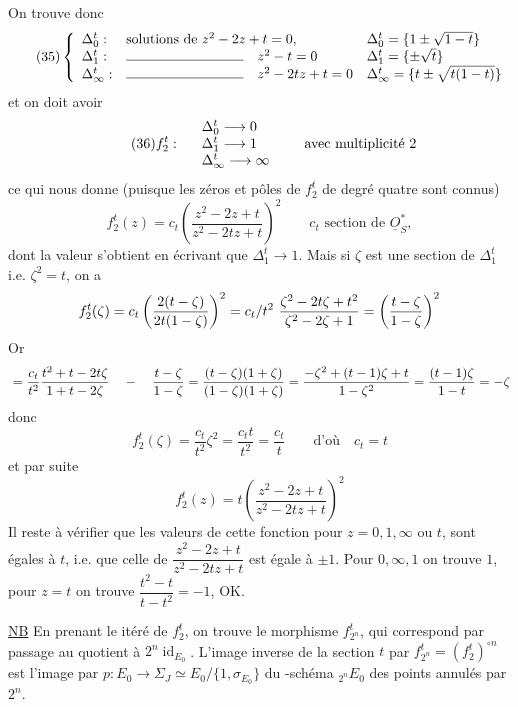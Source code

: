 On trouve donc
\[
\tag{35}\left\{\begin{array}{lll}
\Delta_0^t:&\text{solutions de }z^2-2z+t=0,&\Delta_0^t=\{1\pm\sqrt{1-t}\}\\
\Delta_1^t:&\text{\rule{3cm}{0.4pt}}\quad z^2-t=0&\Delta_1^t=\{\pm\sqrt t\}\\
\Delta_\infty^t:&\text{\rule{3cm}{0.4pt}}\quad z^2-2tz+t=0&\Delta_\infty^t=\{t\pm\sqrt{t(1-t)}\}
\end{array}\right.
\]
et on doit avoir
\[
\tag{36}f_2^t:\quad\begin{array}{l}
\Delta_0^t\longrightarrow0\\
\Delta_1^t\longrightarrow1\\
\Delta_\infty^t\longrightarrow\infty
\end{array}\qquad\text{avec multiplicité }2
\]
ce qui nous donne (puisque les zéros et pôles de $f_2^t$ de degré quatre sont connus)
\[
f_2^t(z)=c_t\left(\frac{z^2-2z+t}{z^2-2tz+t}\right)^2\qquad c_t\text{ section de }\underline O_S^*,
\]
dont la valeur s'obtient en écrivant que $\Delta_1^t\longrightarrow1$. Mais si $\zeta$ est une section de $\Delta_1^t$ i.e. $\zeta^2=t$, on a
\[
f_2^t(\zeta)=c_t\left(\frac{2(t-\zeta)}{2t(1-\zeta)}\right)^2
=c_t/t^2\ \frac{\zeta^2-2t\zeta+t^2}{\zeta^2-2\zeta+1}
=\left(\frac{t-\zeta}{1-\zeta}\right)^2
\]
Or
\[
{}=\frac{c_t}{t^2}\frac{t^2+t-2t\zeta}{1+t-2\zeta}\quad-
\quad\frac{t-\zeta}{1-\zeta}
=\frac{(t-\zeta)(1+\zeta)}{(1-\zeta)(1+\zeta)}
=\frac{-\zeta^2+(t-1)\zeta+t}{1-\zeta^2}
=\frac{(t-1)\zeta}{1-t}=-\zeta
\]
donc
\[
f_2^t(\zeta)=\frac{c_t}{t^2}\zeta^2=\frac{c_t t}{t^2}=\frac{c_t}{t}\qquad\text{d'où}\quad c_t=t
\]
et par suite
\[
\tag{37}f_2^t(z)=t\left(\frac{z^2-2z+t}{z^2-2tz+t}\right)^2
\]
Il reste à vérifier que les valeurs de cette fonction pour $z=0,1,\infty$ ou $t$, sont égales à $t$, i.e. que celle de $\dfrac{z^2-2z+t}{z^2-2tz+t}$ est égale à $\pm1$. Pour $0,\infty,1$ on trouve $1$, pour $z=t$ on trouve $\dfrac{t^2-t}{t-t^2}=-1$, OK.

\uline{NB} En prenant le  itéré de $f_2^t$, on trouve le morphisme $f_{2^n}^t$, qui correspond par passage au quotient à $2^n\operatorname{id}_{E_0}$. L'image inverse de la section $t$ par $f_{2^n}^t=(f_2^t)^{\circ n}$ est l'image par $p:E_0\longrightarrow\Sigma_J\simeq E_0/\{1,\sigma_{E_0}\}$ du  -schéma  ${}_{2^n}E_0$ des points annulés par $2^n$.

